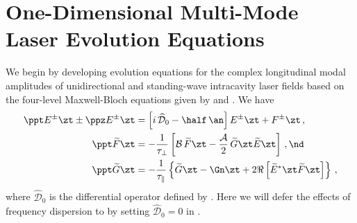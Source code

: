 \section{One-Dimensional Multi-Mode Laser Evolution Equations\label{sct:laser_dynamics_1d_mml_mbe}}

We begin by developing evolution equations for the complex longitudinal modal amplitudes of unidirectional and standing-wave intracavity laser fields based on the four-level Maxwell-Bloch equations given by  and . We have
\begin{subequations}\label{eqn:laser_dynamics_1d_mml_scaled}
  \begin{align}
    \label{eqn:mml_etz_scaled}
    \ppt E^\pm\zt \pm \ppz E^\pm\zt &= \left[ i\, \widehat{\mathcal{D}}_0 - \half\, \an \right] E^\pm\zt + F^\pm\zt\, , \\
    \label{eqn:mml_ftz_scaled} \ppt \widetilde{F}\zt &= -\frac{1}{\tau_\perp} \left[ \mathcal{B}\, \widetilde{F}\zt - \frac{\mathcal{A}}{2}\, \widetilde{G}\zt \widetilde{E}\zt \right]\, , \nd \\
    \label{eqn:mml_gtz_scaled} \ppt \widetilde{G}\zt &= -\frac{1}{\tau_\parallel} \left\{ \widetilde{G}\zt - \Gn\zt + 2 \Re \left[ \widetilde{E}^\ast\zt \widetilde{F}\zt \right] \right\}\, ,
  \end{align}
\end{subequations}
where $\widehat{\mathcal{D}}_0$ is the differential operator defined by . Here we will defer the effects of frequency dispersion to  by setting $\widehat{\mathcal{D}}_0 = 0$ in .

